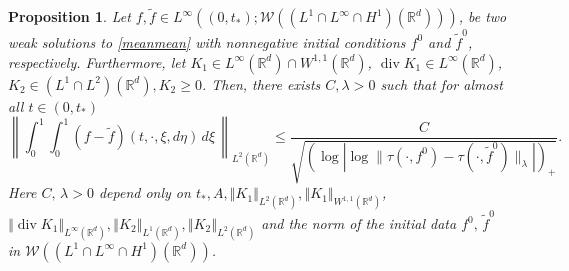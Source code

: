 \documentclass[10pt]{article}
\newtheorem{prop}{Proposition}
\def\divv{\operatorname {div}}
\newcommand*{\norm}[1]{\left\Vert{#1}\right\Vert}
\newcommand{\R}{\mathbb{R}}
\newcommand{\W}{\mathcal{W}}
\begin{document}
\begin{prop}\label{mainstab}
Let  $f,\tilde{f} \in L^\infty((0,t_{*});\W(  (L^1\cap L^\infty\cap H^1)(\R^d)))$, be two weak solutions to \eqref{meanmean} with nonnegative initial conditions $f^0$ and $\tilde{f}^0$, respectively. Furthermore, let $K_1\in L^\infty(\R^d)\cap W^{1,1}(\R^d)$, $\divv K_1\in L^\infty(\R^d)$, $K_2 \in (L^1\cap L^{2})(\R^d), K_2 \geq 0$. Then, there exists $C,\lambda >0 $ such that for almost all  $t \in (0,t_{*})$ 
  \[
\left\|  \int_0^1 \int_0^1 ( f -\tilde f) (t,\cdot, \xi,d\eta)\,d\xi\,\right\|_{L^2(\R^d)}\leq {\frac{C}{\sqrt{(\log |\log \|\tau(\cdot, f^0)-\tau(\cdot,\tilde f^0)\|_{\lambda}|)_+}}.}
  \]
Here $C,\,\lambda>0$  depend only on $t_*,A, \norm{K_1}_{L^{2}(\R^d)}, \norm{K_1}_{W^{1,1}(\R^d)}$, $\norm{\divv K_1}_{L^{\infty}(\R^d)}, \norm{K_2}_{L^{1}(\R^d)}, \norm{K_2}_{L^{2}(\R^d)}$ and the norm of the initial data $f^0,\,\tilde f^0$ in $\W((L^1\cap L^\infty\cap H^1)(\R^d))$.
 \end{prop}
\end{document}
